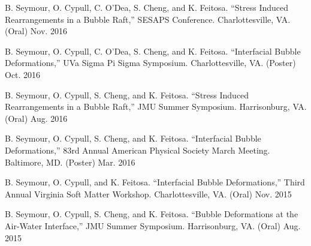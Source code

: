 \begin{cvpresentationsmod}

  \cvpresentation
    {B. Seymour, O. Cypull, C. O’Dea, S. Cheng, and K. Feitosa. “Stress Induced Rearrangements in a Bubble Raft,” SESAPS Conference. Charlottesville, VA. (Oral)} %
    {Nov. 2016} %



  \cvpresentation
    {B. Seymour, O. Cypull, C. O’Dea, S. Cheng, and K. Feitosa. “Interfacial Bubble Deformations,” UVa Sigma Pi Sigma Symposium. Charlottesville, VA. (Poster)} %
    {Oct. 2016} %



  \cvpresentation
    {B. Seymour, O. Cypull, S. Cheng, and K. Feitosa. “Stress Induced Rearrangements in a Bubble Raft,” JMU Summer Symposium. Harrisonburg, VA. (Oral)} %
    {Aug. 2016} %



  \cvpresentation
    {B. Seymour, O. Cypull, S. Cheng, and K. Feitosa. “Interfacial Bubble Deformations,” 83rd Annual American Physical Society March Meeting. Baltimore, MD. (Poster)} %
    {Mar. 2016} %



  \cvpresentation
    {B. Seymour, O. Cypull, and K. Feitosa. “Interfacial Bubble Deformations,” Third Annual Virginia Soft Matter Workshop. Charlottesville, VA. (Oral)} %
    {Nov. 2015} %



  \cvpresentation
    {B. Seymour, O. Cypull, S. Cheng, and K. Feitosa. “Bubble Deformations at the Air-Water Interface,” JMU Summer Symposium. Harrisonburg, VA. (Oral)} %
    {Aug. 2015} %



\end{cvpresentationsmod}
